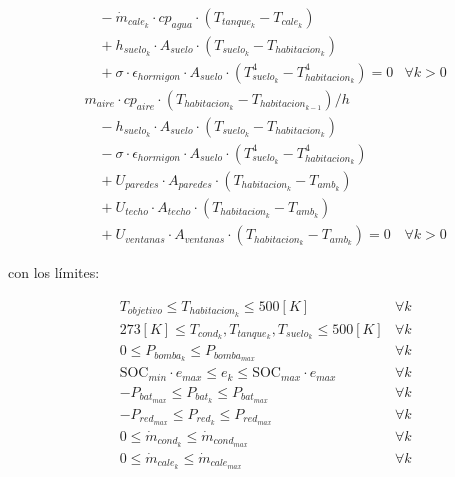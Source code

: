 \begin{align}
	                        & \quad - \dot{m}_{cale_k} \cdot cp_{agua} \cdot (T_{tanque_k} - T_{cale_k})                             \nonumber                               \\
	                        & \quad + h_{suelo_k} \cdot A_{suelo} \cdot (T_{suelo_k} - T_{habitacion_k})                             \nonumber                               \\
	                        & \quad + \sigma \cdot \epsilon_{hormigon} \cdot A_{suelo} \cdot (T_{suelo_k}^4 - T_{habitacion_k}^4) = 0  \label{eq:sys_3_sand} & \forall k > 0 \\
	                        & m_{aire} \cdot cp_{aire} \cdot ( T_{habitacion_k} - T_{habitacion_{k-1}}) / h  \nonumber                                                       \\
	                        & \quad - h_{suelo_k} \cdot A_{suelo} \cdot (T_{suelo_k} - T_{habitacion_k})  \nonumber                                                          \\
	                        & \quad - \sigma \cdot \epsilon_{hormigon} \cdot A_{suelo} \cdot (T_{suelo_k}^4 - T_{habitacion_k}^4)  \nonumber                                 \\
	                        & \quad + U_{paredes} \cdot A_{paredes} \cdot (T_{habitacion_k} - T_{amb_k}) \nonumber                                                           \\
	                        & \quad + U_{techo} \cdot A_{techo} \cdot (T_{habitacion_k} - T_{amb_k}) \nonumber                                                               \\
	                        & \quad + U_{ventanas} \cdot A_{ventanas} \cdot (T_{habitacion_k} - T_{amb_k}) = 0  \label{eq:sys_4_sand}                        & \forall k > 0
\end{align}

con los límites:

\begin{align}
	 & T_{objetivo} \leq T_{habitacion_k} \leq 500[K]  \label{eq:min_t_habitacion_constraint_sand} & \forall k \\
	 & 273[K] \leq T_{cond_k}, T_{tanque_k}, T_{suelo_k} \leq 500[K]                               & \forall k \\
	 & 0 \leq P_{bomba_k} \leq P_{bomba_{max}} \quad                                               & \forall k \\
	 & \text{SOC}_{min} \cdot e_{max} \leq e_k \leq \text{SOC}_{max} \cdot e_{max} \quad           & \forall k \\
	 & -P_{bat_{max}} \leq P_{bat_k} \leq P_{bat_{max}} \quad                                      & \forall k \\
	 & -P_{red_{max}} \leq P_{red_k} \leq P_{red_{max}} \quad                                      & \forall k \\
	 & 0 \leq \dot{m}_{cond_k} \leq \dot{m}_{cond_{max}} \quad                                     & \forall k \\
	 & 0 \leq \dot{m}_{cale_k} \leq \dot{m}_{cale_{max}} \quad                                     & \forall k
\end{align}

